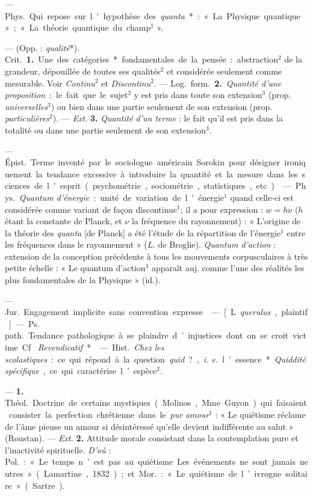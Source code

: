 \begin{itemize}[leftmargin=1cm, label=, itemsep=1pt]
 — \si{Phys.} Qui repose sur l'hypothèse des {\it quanta}* : «
La Physique quantique » ; « La théorie quantique du champ$^1$ ».

 — (Opp. : {\it qualité}*). \si{Crit.} {\bf 1.} Une des
catégories* fondamentales de la pensée : abstraction$^2$ de la grandeur,
dépouillée de toutes ses qualités$^2$ et considérée seulement comme
mesurable. Voir {\it Continu}$^2$ et {\it Discontinu}$^2$. — \si{Log.}
\si{form.} {\bf 2.} {\it Quantité d'une proposition} : le fait que le
sujet$^2$ y est pris dans toute son extension$^3$ (prop.
{\it universelles}$^3$) ou bien dans une partie seulement de son extension
(prop. {\it particulières}$^2$). — {\it Ext.} {\bf 3.} {\it Quantité d'un
terme} : le fait qu'il est pris dans la totalité ou dans une partie seulement
de son extension$^3$.

 — \si{Épist.} Terme inventé par le sociologue américain
Sorokin pour désigner ironiquement la tendance excessive à introduire la
quantité et la mesure dans les sciences de l'esprit (psychométrie,
sociométrie, statistiques, etc.).

 — \si{Phys.} {\it Quantum d'énergie} : unité de variation de
l'énergie$^1$ quand celle-ci est considérée comme variant de façon
discontinue$^1$; il a pour expression : $ w = h \nu $ ($h$ étant la constante
de Planck, et $\nu$ la fréquence du rayonnement) : « L’origine de la théorie
des {\it quanta} [de Planck] a été l'étude de la répartition de l’énergie$^1$
entre les fréquences dans le rayonnement » ({\it L.} de Broglie). {\it
Quantum d’action} : extension de la conception précédente à tous les
mouvements corpusculaires à très petite échelle : « Le quantum d'action$^3$
apparaît auj. comme l’une des réalités les plus fondamentales de la Physique
» (id.).

 — \si{Jur.} Engagement implicite sans convention expresse.

 — [L. {\it querulus}, plaintif] — \si{Ps. path.} Tendance
pathologique à se plaindre d’injustices dont on se croit victime. Cf. {\it
Revendicatif}*.

 — \si{Hist.} {\it Chez les scolastiques} : ce qui répond à la
question {\it quid} ?, {\it i. e.} l’essence*. {\it Quiddité spécifique}, ce
qui caractérise l’espèce$^2$.

 —  {\bf 1.} \si{Théol.} Doctrine de certains
mystiques (Molinos, Mme Guyon) qui faisaient consister la perfection
chrétienne dans le {\it pur amour}$^1$ : « Le quiétisme réclame de l'âme
pieuse un amour si désintéressé qu'elle devient indifférente au salut
» (Roustan). — {\it Ext.}  {\bf 2.} Attitude morale consistant
dans la contemplation pure et l'inactivité spirituelle. {\it D’où} :
\si{Pol.} : « Le temps n'est pas au quiétisme... Les événements ne sont
jamais neutres » (Lamartine, 1832) ; et \si{Mor.} : « Le quiétisme de
l’ivrogne solitaire » (Sartre).


\end{itemize}
